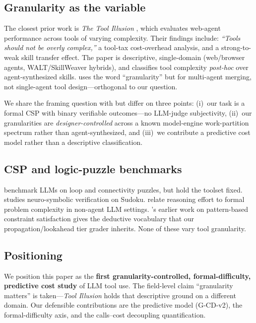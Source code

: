 \documentclass[11pt,letterpaper]{article}
\begin{document}
\subsection{Granularity as the variable}

The closest prior work is \emph{The Tool Illusion}
\citep{lou2026illusion}, which evaluates web-agent performance
across tools of varying complexity. Their findings include:
\emph{``Tools should not be overly complex,''} a tool-tax
cost-overhead analysis, and a strong-to-weak skill transfer effect.
The paper is descriptive, single-domain (web/browser agents,
WALT/SkillWeaver hybrids), and classifies tool complexity
\emph{post-hoc} over agent-synthesized skills.
\citet{ray2026capsules} uses the word ``granularity'' but for
multi-agent merging, not single-agent tool design---orthogonal to
our question.

We share the framing question with \citet{lou2026illusion} but
differ on three points: (i)~our task is a formal CSP with binary
verifiable outcomes---no LLM-judge subjectivity, (ii)~our
granularities are \emph{designer-controlled} across a known
model-engine work-partition spectrum rather than agent-synthesized,
and (iii)~we contribute a predictive cost model rather than a
descriptive classification.

\subsection{CSP and logic-puzzle benchmarks}

\citet{maniparambil2026topobench} benchmark LLMs on loop and
connectivity puzzles, but hold the toolset fixed.
\citet{miya2025eidoku} studies neuro-symbolic verification on
Sudoku. \citet{estermann2025reasoning} relate reasoning effort to
formal problem complexity in non-agent LLM settings.
\citet{berthier2013pattern}'s earlier work on pattern-based
constraint satisfaction gives the deductive vocabulary that our
propagation/lookahead tier grader inherits. None of these vary tool
granularity.

\subsection{Positioning}

We position this paper as the \textbf{first granularity-controlled,
formal-difficulty, predictive cost study} of LLM tool use. The
field-level claim ``granularity matters'' is taken---\emph{Tool
Illusion} holds that descriptive ground on a different domain. Our
defensible contributions are the predictive model (G-CD-v2), the
formal-difficulty axis, and the calls--cost decoupling
quantification.
\end{document}
